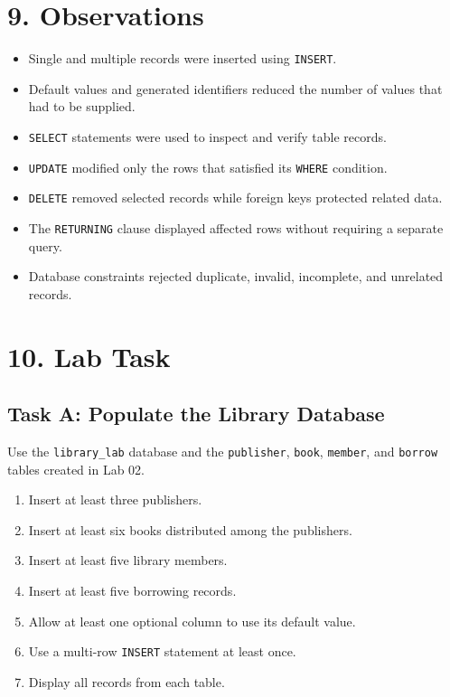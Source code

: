 \documentclass[12pt,a4paper]{article}
\begin{document}
\section*{9. Observations}
\begin{itemize}
    \item Single and multiple records were inserted using \texttt{INSERT}.
    \item Default values and generated identifiers reduced the number of values that had to be supplied.
    \item \texttt{SELECT} statements were used to inspect and verify table records.
    \item \texttt{UPDATE} modified only the rows that satisfied its \texttt{WHERE} condition.
    \item \texttt{DELETE} removed selected records while foreign keys protected related data.
    \item The \texttt{RETURNING} clause displayed affected rows without requiring a separate query.
    \item Database constraints rejected duplicate, invalid, incomplete, and unrelated records.
\end{itemize}

\section*{10. Lab Task}

\subsection*{Task A: Populate the Library Database}
Use the \texttt{library\_lab} database and the \texttt{publisher}, \texttt{book}, \texttt{member},
and \texttt{borrow} tables created in Lab 02.

\begin{enumerate}
    \item Insert at least three publishers.
    \item Insert at least six books distributed among the publishers.
    \item Insert at least five library members.
    \item Insert at least five borrowing records.
    \item Allow at least one optional column to use its default value.
    \item Use a multi-row \texttt{INSERT} statement at least once.
    \item Display all records from each table.
\end{enumerate}
\end{document}
